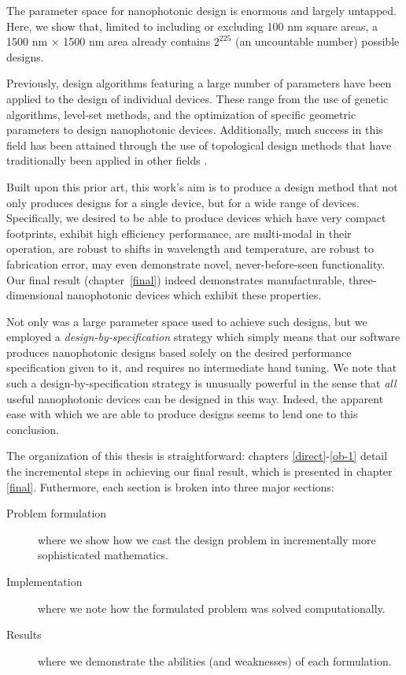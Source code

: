     {The parameter space for nanophotonic design is enormous and largely untapped.
    Here, we show that, 
        limited to including or excluding 100 nm square areas,
        a 1500 nm $\times$ 1500 nm area already contains $2^{225}$ 
        (an uncountable number) possible designs.}
  
Previously, design algorithms featuring a large number of parameters
    have been applied to the design of individual devices.
These range from the use of genetic algorithms\cite{lipson},
    level-set methods\cite{yablo}, 
    and the optimization of specific geometric parameters\cite{levi,johnson}
    to design nanophotonic devices.
Additionally, much success in this field has been attained\cite{sigmund1}
    through the use of topological design methods that
    have traditionally been applied in other fields \cite{jameson,bendsoe}.

Built upon this prior art,
    this work's aim is to produce a design method 
    that not only produces designs for a single device,
    but for a wide range of devices.
Specifically,
    we desired to be able to produce devices which
    \BI have very compact footprints,
    \I  exhibit high efficiency performance,
    \I  are multi-modal in their operation,
    \I  are robust to shifts in wavelength and temperature,
    \I  are robust to fabrication error,
    \I  may even demonstrate novel, never-before-seen functionality. \EI
Our final result (chapter~\ref{final}) indeed demonstrates
    manufacturable, three-dimensional nanophotonic devices which
    exhibit these properties.

Not only was a large parameter space used to achieve such designs,
    but we employed a \emph{design-by-specification} strategy
    which simply means that our software produces nanophotonic designs
    based solely on the desired performance specification given to it,
    and requires no intermediate hand tuning.
We note that such a design-by-specification strategy
    is unusually powerful in the sense that \emph{all} useful nanophotonic devices
    can be designed in this way.
Indeed, the apparent ease with which we are able to produce designs seems
    to lend one to this conclusion.

The organization of this thesis is straightforward: 
    chapters \ref{direct}-\ref{ob-1} detail the incremental steps in achieving
    our final result, which is presented in chapter \ref{final}.
Futhermore, each section is broken into three major sections:
    \begin{description}
    \item[Problem formulation] where we show how we cast the design problem
        in incrementally more sophisticated mathematics.
    \item[Implementation] where we note how the formulated problem 
        was solved computationally.
    \item[Results] where we demonstrate the abilities (and weaknesses)
        of each formulation.
    \end{description}

